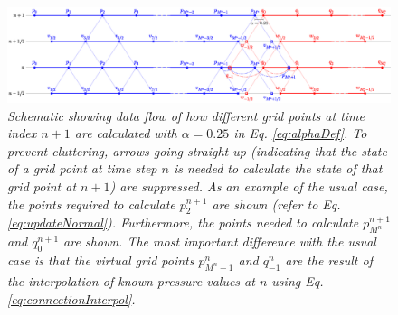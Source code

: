 \begin{figure}[t]
    \centering
    \includegraphics[width = \textwidth]{Figures/tromboneSchematic.eps}
    \caption{\it Schematic showing data flow of how different grid points at time index $n+1$ are calculated with $\alpha = 0.25$ in Eq. \eqref{eq:alphaDef}. To prevent cluttering, arrows going straight up (indicating that the state of a grid point at time step $n$ is needed to calculate the state of that grid point at $n+1$) are suppressed. As an example of the usual case, the points required to calculate $p_2^{n+1}$ are shown (refer to Eq. \eqref{eq:updateNormal}). Furthermore, the points needed to calculate $p_{M^n}^{n+1}$ and $q_0^{n+1}$ are shown. The most important difference with the usual case is that the virtual grid points $p_{M^n+1}^n$ and $q_{-1}^n$ 
    are the result of the interpolation of known pressure values at $n$ using Eq. \eqref{eq:connectionInterpol}. %
    \label{fig:dynamicGridSchematic}}
\end{figure}

